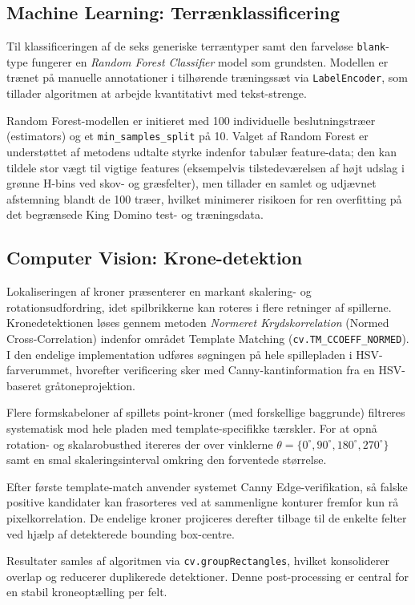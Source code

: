 \subsection{Machine Learning: Terrænklassificering}
Til klassificeringen af de seks generiske terræntyper samt den farveløse \texttt{blank}-type fungerer en \textit{Random Forest Classifier} model som grundsten. Modellen er trænet på manuelle annotationer i tilhørende træningssæt via \texttt{LabelEncoder}, som tillader algoritmen at arbejde kvantitativt med tekst-strenge.

Random Forest-modellen er initieret med 100 individuelle beslutningstræer (estimators) og et \texttt{min\_samples\_split} på 10. Valget af Random Forest er understøttet af metodens udtalte styrke indenfor tabulær feature-data; den kan tildele stor vægt til vigtige features (eksempelvis tilstedeværelsen af højt udslag i grønne H-bins ved skov- og græsfelter), men tillader en samlet og udjævnet afstemning blandt de 100 træer, hvilket minimerer risikoen for ren overfitting på det begrænsede King Domino test- og træningsdata.

\subsection{Computer Vision: Krone-detektion}
Lokaliseringen af kroner præsenterer en markant skalering- og rotationsudfordring, idet spilbrikkerne kan roteres i flere retninger af spillerne. Kronedetektionen løses gennem metoden \textit{Normeret Krydskorrelation} (Normed Cross-Correlation) indenfor området Template Matching (\texttt{cv.TM\_CCOEFF\_NORMED}). I den endelige implementation udføres søgningen på hele spillepladen i HSV-farverummet, hvorefter verificering sker med Canny-kantinformation fra en HSV-baseret gråtoneprojektion.

Flere formskabeloner af spillets point-kroner (med forskellige baggrunde) filtreres systematisk mod hele pladen med template-specifikke tærskler. For at opnå rotation- og skalarobusthed itereres der over vinklerne $\theta = \{0^\circ, 90^\circ, 180^\circ, 270^\circ\}$ samt en smal skaleringsinterval omkring den forventede størrelse.

Efter første template-match anvender systemet Canny Edge-verifikation, så falske positive kandidater kan frasorteres ved at sammenligne konturer fremfor kun rå pixelkorrelation. De endelige kroner projiceres derefter tilbage til de enkelte felter ved hjælp af detekterede bounding box-centre.

Resultater samles af algoritmen via \texttt{cv.groupRectangles}, hvilket konsoliderer overlap og reducerer duplikerede detektioner. Denne post-processing er central for en stabil kroneoptælling per felt.

